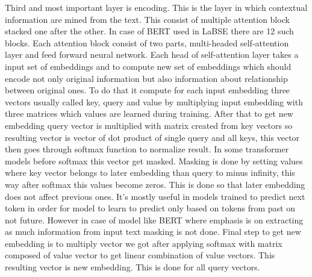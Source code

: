 Third and most important layer is encoding. This is the layer in which contextual information are mined from the text. This consist of multiple attention block stacked one after the other. In case of BERT used in LaBSE there are 12 such blocks. Each attention block consist of two parts, multi-headed self-attention layer and feed forward neural network. Each head of self-attention layer takes a input set of embeddings and to compute new set of embeddings which should encode not only original information but also information about relationship between original ones. To do that it compute for each input embedding three vectors usually called key, query and value by multiplying input embedding with three matrices which values are learned during training. After that to get new embedding query vector is multiplied with matrix created from key vectors so resulting vector is vector of dot product of single query and all keys, this vector then goes through softmax function to normalize result. In some transformer models before softmax this vector get masked. Masking is done by setting values where key vector belongs to later embedding than query to minus infinity, this way after softmax this values become zeros. This is done so that later embedding does not affect previous ones. It's mostly useful in models trained to predict next token in order for model to learn to predict only based on tokens from past on not future. However in case of model like BERT where emphasis is on extracting as much information from input text masking is not done. Final step to get new embedding is to multiply vector we got after applying softmax with matrix composed of value vector to get linear combination of value vectors. This resulting vector is new embedding. This is done for all query vectors.

 


